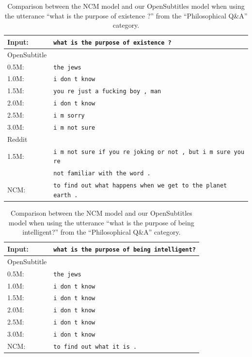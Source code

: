 \begin{table}[H]
	\centering
	\begin{adjustbox}{max width=\textwidth}
		\begin{tabular}{ll}
			\toprule
			Input: 	& \texttt{what is the purpose of existence ?}\\
			\midrule
			OpenSubtitle\\
			0.5M: 	& \texttt{the jews}\\
			1.0M: 	& \texttt{i don t know}\\
			1.5M:	& \texttt{you re just a fucking boy , man}\\
			2.0M:	& \texttt{i don t know}\\
			2.5M:	& \texttt{i m sorry}\\
			3.0M:	& \texttt{i m not sure}\\
			\midrule
			Reddit\\
			1.5M:	& \texttt{i m not sure if you re joking or not , but i m sure you re }\\
			& \texttt{not familiar with the word .}\\
			\midrule
			NCM:	& \texttt{to find out what happens when we get to the planet earth .}\\
			\bottomrule
		\end{tabular}
	\end{adjustbox}
	\caption{Comparison between the NCM model and our OpenSubtitles model when using the utterance ``what is the purpose of existence ?'' from the ``Philosophical Q\&A'' category.}
	\label{results:example13_output:Neural_Conversational_Model_compared}
\end{table}

\begin{table}[H]
	\centering
	\begin{adjustbox}{max width=\textwidth}
		\begin{tabular}{ll}
			\toprule
			Input: 	& \texttt{what is the purpose of being intelligent?}\\
			\midrule
			OpenSubtitle\\
			0.5M: 	& \texttt{the jews}\\
			1.0M: 	& \texttt{i don t know}\\
			1.5M:	& \texttt{i don t know}\\
			2.0M:	& \texttt{i don t know}\\
			2.5M:	& \texttt{i don t know}\\
			3.0M:	& \texttt{i don t know}\\
			\midrule
			NCM:	& \texttt{to find out what it is .}\\
			\bottomrule
		\end{tabular}
	\end{adjustbox}
	\caption{Comparison between the NCM model and our OpenSubtitles model when using the utterance ``what is the purpose of being intelligent?'' from the ``Philosophical Q\&A'' category.}
	\label{results:example20_output:OpenSubtitle}
\end{table}


